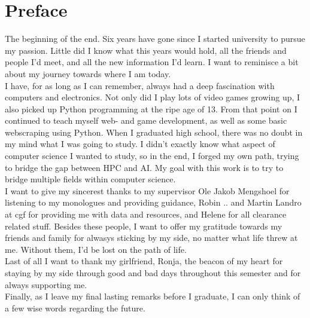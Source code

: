 \chapter*{Preface}

The beginning of the end. Six years have gone since I started university to pursue my passion. Little did I know what this years would hold, all the friends and people I'd meet, and all the new information I'd learn. I want to reminisce a bit about my journey towards where I am today. \\

I have, for as long as I can remember, always had a deep fascination with computers and electronics. Not only did I play lots of video games growing up, I also picked up Python programming at the ripe age of 13. From that point on I continued to teach myself web- and game development, as well as some basic webscraping using Python. When I graduated high school, there was no doubt in my mind what I was going to study. I didn't exactly know what aspect of computer science I wanted to study, so in the end, I forged my own path, trying to bridge the gap between HPC and AI. My goal with this work is to try to bridge multiple fields within computer science. \\

I want to give my sincerest thanks to my supervisor Ole Jakob Mengshoel for listening to my monologues and providing guidance, Robin .. and Martin Landro at \acrlong{cgf} for providing me with data and resources, and Helene for all clearance related stuff. Besides these people, I want to offer my gratitude towards my friends and family for alwasys sticking by my side, no matter what life threw at me. Without them, I'd be lost on the path of life. \\

Last of all I want to thank my girlfriend, Ronja, the beacon of my heart for staying by my side through good and bad days throughout this semester and for always supporting me. \\

Finally, as I leave my final lasting remarks before I graduate, I can only think of a few wise words regarding the future.
